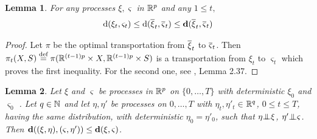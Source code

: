 \documentclass{article}              %
\newtheorem{lemma}{Lemma}
\begin{document}
\begin{lemma}
\label{lem:ddd}For any processes $\xi,\varsigma$ in $\mathbb{R}^{p}$ and
any $1\leq t,$
\[
\mathrm{d}(\xi_{t},\varsigma_{t})\leq\mathrm{d}(\overline{\xi}_{t},\overline{\varsigma}_{t})\leq\mathbf{d}(\overline{\xi}_{t},\overline{\varsigma}_{t})
\]
\end{lemma}

\begin{proof}
Let $\pi$ be the optimal transportation from $\overline{\xi}_{t}$ to $\overline{\varsigma}_{t}$.
Then $\pi_{t}(X,S)\stackrel{\text{\rm def}}{=} \pi(\mathbb{R}^{(t-1)p}\times X,\mathbb{R}^{(t-1)p}\times S)$
is a transportation from $\xi_{t}$ to $\varsigma_{t}$ which proves the
first inequality. For the second one, see \cite{pflug2014multistage},
Lemma 2.37.
\end{proof}
 
\begin{lemma}
\label{lem:indep}Let $\xi$ and $\varsigma$ be processes in $\mathbb{R}^p$ on $\{0,\dots,T\}$ with deterministic $\xi_0$ and $\varsigma_0$ . Let  $q\in \mathbb{N}$ and let $\eta,\eta'$ be processes on ${0,\dots,T}$ with $\eta_{t},\eta'_{t}\in$$\mathbb{R}^{q}$, $0\leq t\leq T$, 
having the same distribution, 
with deterministic $\eta_{0}=\eta'_{0}$, such that $\eta\indep{\xi}$, \textup{$\eta'\indep{\varsigma}$.
}Then $\mathbf{d}((\xi,\eta),(\varsigma,\eta'))\leq\mathbf{d}(\xi,\varsigma)$.
\end{lemma}
\end{document}
